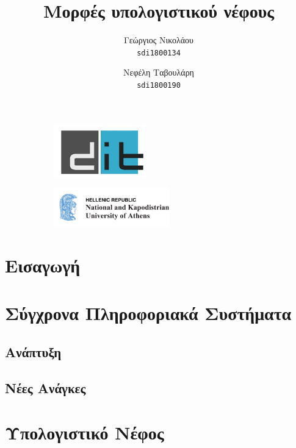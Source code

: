 \documentclass{article}
\title{%
  \selectlanguage{greek}\Huge
 Μορφές υπολογιστικού νέφους \\}
\begin{document}

\author{\LARGE
  Γεώργιος Νικολάου\\
   \texttt{\large sdi1800134}
  \and
  \LARGE
  Νεφέλη Ταβουλάρη\\
   \texttt{\large sdi1800190}
}

\maketitle


\begin{figure}
\centering
\begin{subfigure}
  \centering
  \includegraphics[width=40mm]{dit_logo}
  \label{fig:sub1}
\end{subfigure}%
\begin{subfigure}
  \centering
  \includegraphics[width=50mm]{NKUA_logo}
  \label{fig:sub2}
\end{subfigure}
\label{fig:test}
\end{figure}




\newpage
\tableofcontents
\newpage
\section{Εισαγωγή}
\section{Σύγχρονα Πληροφοριακά Συστήματα}
\subsection{Ανάπτυξη}
\subsection{Νέες Ανάγκες}
\section{Υπολογιστικό Νέφος}
\end{document}
